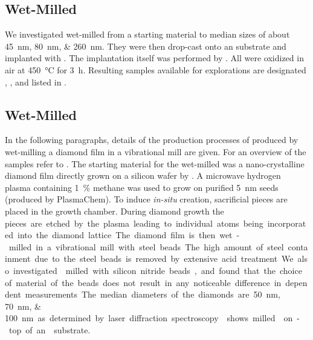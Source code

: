 	\subsection{Wet-Milled \HPHT \Nds}\label{subsec::milled_hpht_nds}
		We investigated \nds wet-milled from a \HPHT starting material to median sizes of about \SIlist{45;80;260}{nm}.
		They were then drop-cast onto an \ir substrate and implanted with  . The implantation itself was performed by \rogalla.
		All \HPHT \nds were oxidized in air at \SI{450}{\celsius} for \SI{3}{\hour}. Resulting samples available for explorations are designated \hphtimpfortyfive, \hphtimpeighty, \hphtimptwosixty and listed in .

	\subsection{Wet-Milled \CVD \Nds}\label{subsec::milled_nds}

		In the following paragraphs, details of the production processes of \nd produced by wet-milling a \CVD diamond film in a vibrational mill are given.
		For an overview of the samples refer to .
		The starting material for the wet-milled \nds was a nano-crystalline diamond film \cite{Williams2006a} directly grown on a silicon wafer by \CVD.
		A microwave hydrogen plasma containing \SI{1}{\percent} methane was used to grow on purified \SI{5}{\nano\meter} \nd seeds (produced by PlasmaChem).
		To induce \textit{in-situ} \siv creation, sacrificial \Si pieces are placed in the growth chamber.
		During diamond growth the \si pieces are etched by the plasma leading to individual atoms being incorporated into the diamond lattice.
		The diamond film is then wet-milled in a vibrational mill with steel beads.
		The high amount of steel containment due to the steel beads is removed by extensive acid treatment.
		We also investigated \nds milled with silicon nitride beads, and found that the choice of material of the beads does not result in any noticeable difference in dependent measurements.
		The median diameters of the diamonds are \SIlist{50; 70; 100}{\nano\meter} as determined by laser diffraction spectroscopy.  shows milled \nds on-top of an \ir substrate.

